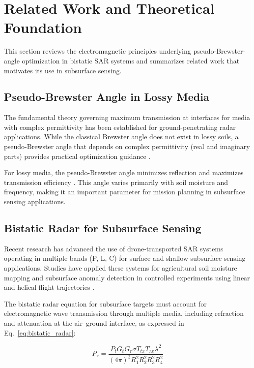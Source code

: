 \documentclass[conference]{IEEEtran}
\begin{document}
\section{Related Work and Theoretical Foundation}

This section reviews the electromagnetic principles underlying pseudo-Brewster-angle optimization in bistatic SAR systems and summarizes related work that motivates its use in subsurface sensing.

\subsection{Pseudo-Brewster Angle in Lossy Media}

The fundamental theory governing maximum transmission at interfaces for media with complex permittivity has been established for ground-penetrating radar applications. While the classical Brewster angle does not exist in lossy soils, a pseudo-Brewster angle that depends on complex permittivity (real and imaginary parts) provides practical optimization guidance \cite{mcmichael_brewster}.

For lossy media, the pseudo-Brewster angle minimizes reflection and maximizes transmission efficiency \cite{mcmichael_brewster}. This angle varies primarily with soil moisture and frequency, making it an important parameter for mission planning in subsurface sensing applications.

\subsection{Bistatic Radar for Subsurface Sensing}

Recent research has advanced the use of drone-transported SAR systems operating in multiple bands (P, L, C) for surface and shallow subsurface sensing applications. Studies have applied these systems for agricultural soil moisture mapping and subsurface anomaly detection in controlled experiments using linear and helical flight trajectories \cite{ore_soil_moisture}.

The bistatic radar equation for subsurface targets must account for electromagnetic wave transmission through multiple media, including refraction and attenuation at the air–ground interface, as expressed in Eq.~\ref{eq:bistatic_radar}:

\begin{equation}
P_r = \frac{P_t G_t G_r \sigma T_{tx} T_{rx} \lambda^2}{(4\pi)^3 R_1^2 R_2^2 R_3^2 R_4^2}
\label{eq:bistatic_radar}
\end{equation}
\end{document}
